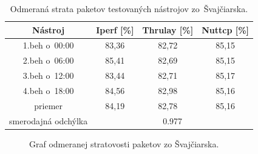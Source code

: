     \begin{table}[h!]
        \begin{center}
            \begin{tabular}{|c|c|c|c|}
                \hline
                Nástroj & Iperf [\%]&  Thrulay [\%]& Nuttcp [\%]\\ 
                \hline
                1.beh o~00:00 & 83,36 & 82,72 & 85,15 \\
                \hline
                2.beh o~06:00 & 85,41 & 82,69 & 85,15 \\
                \hline
                3.beh o~12:00 & 83,44 & 82,71 & 85,17 \\
                \hline
                4.beh o~18:00 & 84,56 & 82,98 & 85,16 \\
                \hline
                priemer       & 84,19 & 82,78 & 85,16 \\
                \hline
                smerodajná odchýlka & \multicolumn{3}{c|}{0.977}\\
                \hline
            \end{tabular}
            \caption{Odmeraná strata paketov testovaných nástrojov zo~Švajčiarska.} 
            \label{tab_test_loss_swiss}
        \end{center}
    \end{table}
   \begin{figure}[H]
       \begin{center}
               \caption{Graf odmeranej stratovosti paketov zo Švajčiarska.}
           \label{tab_test_loss_swiss_graf}
       \end{center}
   \end{figure}

